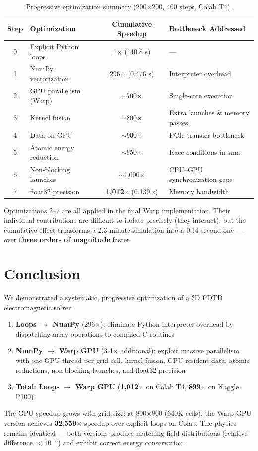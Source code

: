 \documentclass[11pt,a4paper]{article}
\begin{document}
\begin{table}[H]
\centering
\caption{Progressive optimization summary (200$\times$200, 400 steps, Colab T4).}
\begin{tabular}{@{}clcl@{}}
\toprule
\textbf{Step} & \textbf{Optimization} & \textbf{Cumulative Speedup} & \textbf{Bottleneck Addressed} \\
\midrule
0 & Explicit Python loops & 1$\times$ (140.8 s) & --- \\
1 & NumPy vectorization & 296$\times$ (0.476 s) & Interpreter overhead \\
2 & GPU parallelism (Warp) & $\sim$700$\times$ & Single-core execution \\
3 & Kernel fusion & $\sim$800$\times$ & Extra launches \& memory passes \\
4 & Data on GPU & $\sim$900$\times$ & PCIe transfer bottleneck \\
5 & Atomic energy reduction & $\sim$950$\times$ & Race conditions in sum \\
6 & Non-blocking launches & $\sim$1,000$\times$ & CPU--GPU synchronization gaps \\
7 & float32 precision & \textbf{1,012$\times$} (0.139 s) & Memory bandwidth \\
\bottomrule
\end{tabular}
\end{table}

\noindent Optimizations 2--7 are all applied in the final Warp implementation. Their individual contributions are difficult to isolate precisely (they interact), but the cumulative effect transforms a 2.3-minute simulation into a 0.14-second one --- over \textbf{three orders of magnitude} faster.


\section{Conclusion}

We demonstrated a systematic, progressive optimization of a 2D FDTD electromagnetic solver:

\begin{enumerate}[nosep]
    \item \textbf{Loops $\to$ NumPy} (296$\times$): eliminate Python interpreter overhead by dispatching array operations to compiled C routines
    \item \textbf{NumPy $\to$ Warp GPU} (3.4$\times$ additional): exploit massive parallelism with one GPU thread per grid cell, kernel fusion, GPU-resident data, atomic reductions, non-blocking launches, and float32 precision
    \item \textbf{Total: Loops $\to$ Warp GPU} (\textbf{1,012$\times$} on Colab T4, \textbf{899$\times$} on Kaggle P100)
\end{enumerate}

The GPU speedup grows with grid size: at 800$\times$800 (640K cells), the Warp GPU version achieves \textbf{32,559$\times$} speedup over explicit loops on Colab. The physics remains identical --- both versions produce matching field distributions (relative difference $< 10^{-5}$) and exhibit correct energy conservation.
\end{document}
